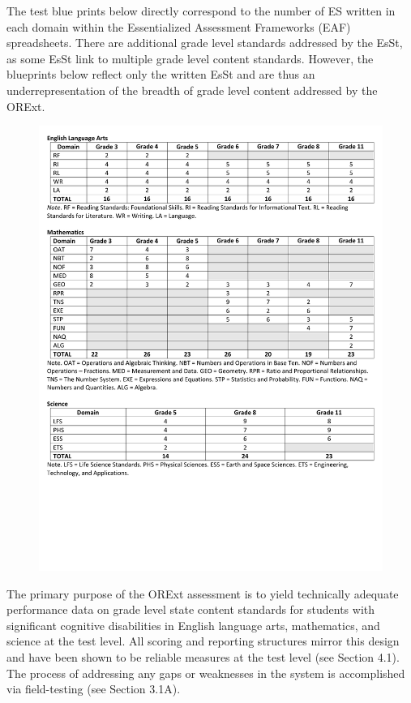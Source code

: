 \documentclass[]{article}
\begin{document}
The test blue prints below directly correspond to the number of ES
written in each domain within the Essentialized Assessment Frameworks
(EAF) spreadsheets. There are additional grade level standards addressed
by the EsSt, as some EsSt link to multiple grade level content
standards. However, the blueprints below reflect only the written EsSt
and are thus an underrepresentation of the breadth of grade level
content addressed by the ORExt.

\begin{figure}
\centering
\includegraphics{Figures/EsSt/EsSt.pdf}
\caption{}
\end{figure}

The primary purpose of the ORExt assessment is to yield technically
adequate performance data on grade level state content standards for
students with significant cognitive disabilities in English language
arts, mathematics, and science at the test level. All scoring and
reporting structures mirror this design and have been shown to be
reliable measures at the test level (see Section 4.1). The process of
addressing any gaps or weaknesses in the system is accomplished via
field-testing (see Section 3.1A).
\end{document}

